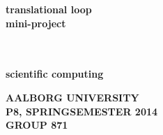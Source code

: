 \begin{center}
	\vspace*{4cm}
	
	\begin{huge}
		\textbf{ \textcolor{verydarkblue}{translational loop\\
                \bigskip
                mini-project}}
	\end{huge}\\~\\
	\vspace{-2mm}
	\textbf{scientific computing}
	\vspace*{2cm}		
		

	\vspace*{12cm}
   	\begin{small}
	\textbf{AALBORG UNIVERSITY\\
	\smallskip
	P8, SPRINGSEMESTER 2014\\
	GROUP 871}
	\end{small}

\end{center}

